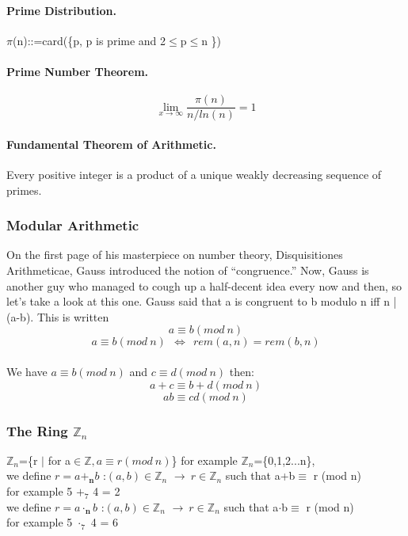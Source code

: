 \documentclass[10pt]{article}
\begin{document}
{{				\paragraph{Prime Distribution. }
				{
					\begin{center}$\pi$(n)::=card(\{p, p is prime and 2$\leq$p$ \leq $n     \})\end{center}
				}
				\paragraph{Prime Number Theorem. }{
					$$\lim_{x\to\infty}\frac{\pi(n)}{n/ln(n)}=1$$
				}
				\paragraph{Fundamental Theorem of Arithmetic. }{Every positive integer is a
				product of a unique weakly decreasing sequence of primes.}
			}
			\subsubsection{Modular Arithmetic}{
				On the first page of his masterpiece on number theory, Disquisitiones Arithmeticae,
				Gauss introduced the notion of “congruence.” Now, Gauss is another guy who
				managed to cough up a half-decent idea every now and then, so let’s take a look
				at this one. Gauss said that a is congruent to b modulo n iff n | (a-b). This is
				written
				$$ a\equiv b (mod\ n) $$
				\begin{equation}\label{key}
				 a\equiv b (mod\ n)\ \ \Leftrightarrow\ \ rem(a,n)= rem(b,n) 
				\end{equation}
				\\We have $a\equiv b (mod\ n)$ and $c\equiv d (mod\ n)$ then:
				$$ a+c \equiv b+d (mod\ n)$$ $$ a b\equiv cd (mod\ n)$$ 
			\subsubsection{The Ring $ \mathbb{Z}_n $}{
				$ \mathbb{Z}_n $=\{r $|$ for a$ \in \mathbb{Z}, a\equiv r (mod\ n) $\}	 for example $\mathbb{Z}_n $=\{0,1,2...n\},\\ 
				we define $ r=a\pmb{+_n} b $ :$(a,b)\in\mathbb{Z}_n $ $\rightarrow\ $$r\in\mathbb{Z}_n $ such that a+b$ \equiv $ r (mod n)\\
				for example 5 $ +_7 $ 4 = 2 \\
				we define $ r=a\pmb{\cdot_n} b $ :$(a,b)\in\mathbb{Z}_n $ $\rightarrow\ $$r\in\mathbb{Z}_n $ such that a$ \cdot $b$ \equiv $ r (mod n)\\
				for example 5 $ \cdot_7 $ 4 = 6
				
				
				}
			}
			
		
	
		
	
	}
\end{document}
